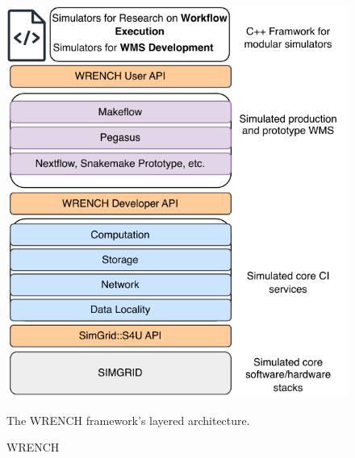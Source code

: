 \begin{figure}[H]
    \centering
    \includegraphics[scale=0.7]{fig/02/02-wrench.pdf}
    \caption{WRENCH}
    \label{fig:02-wrench}
    \tiny
    The WRENCH framework's layered architecture.
\end{figure}





